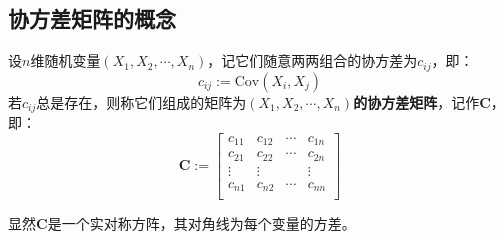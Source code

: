 \subsection{协方差矩阵的概念}

\begin{definition}[协方差矩阵]
设$n$维随机变量$\left( X_1,X_2,\cdots ,X_n \right) $，记它们随意两两组合的协方差为$c_{ij}$，即：
\[
c_{ij}:=\mathrm{Cov}\left( X_i,X_j \right)
\]
若$c_{ij}$总是存在，则称它们组成的矩阵为{\bf $\left( X_1,X_2,\cdots ,X_n \right) $的协方差矩阵}，记作$\mathbf{C}$，即：
\[
\mathbf{C}:=\left[ \begin{matrix}
	c_{11}&		c_{12}&		\cdots&		c_{1n}\\
   	c_{21}&		c_{22}&		\cdots&		c_{2n}\\
   	\vdots&		\vdots&		&		\vdots\\
   	c_{n1}&		c_{n2}&		\cdots&		c_{nn}\\
\end{matrix} \right]
\]
\end{definition}

显然$\mathbf{C}$是一个实对称方阵，其对角线为每个变量的方差。




